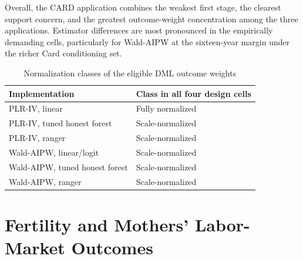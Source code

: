 \documentclass[12pt, a4paper, oneside]{article}
\theoremstyle{plain}
\theoremstyle{definition}
\begin{document}
 Overall, the CARD application combines the weakest first stage, the clearest support concern, and the greatest outcome-weight concentration among the three applications. Estimator differences are most pronounced in the empirically demanding cells, particularly for Wald-AIPW at the sixteen-year margin under the richer Card conditioning set.
 




\begin{table}[H]
    \centering
    \caption{Normalization classes of the eligible DML outcome weights}
    \label{tab:card_dml_normalization}
    \begin{threeparttable}
        \begin{tabular}{@{}ll@{}}
            \toprule
            Implementation & Class in all four design cells \\
            \midrule
            PLR-IV, linear              & Fully normalized \\
            PLR-IV, tuned honest forest & Scale-normalized \\
            PLR-IV, ranger              & Scale-normalized \\
            Wald-AIPW, linear/logit      & Scale-normalized \\
            Wald-AIPW, tuned honest forest
                                             & Scale-normalized \\
            Wald-AIPW, ranger            & Scale-normalized \\
            \bottomrule
        \end{tabular}
    \end{threeparttable}
\end{table}







\section{Fertility and Mothers' Labor-Market Outcomes}
\label{sec:child}
\end{document}
